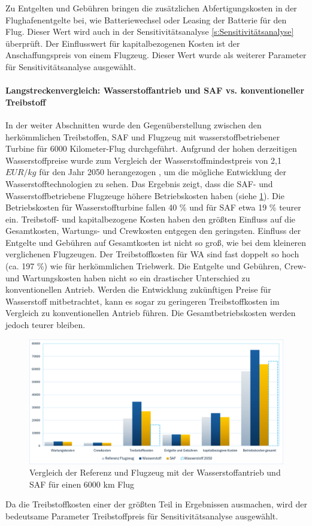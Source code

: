 Zu Entgelten und Gebühren bringen die zusätzlichen Abfertigungskosten in der Flughafenentgelte bei, wie Batteriewechsel oder Leasing der Batterie
für den Flug. Dieser Wert wird auch in der Sensitivitätsanalyse \ref{s:Sensitivitätsanalyse} überprüft. Der Einflusswert für kapitalbezogenen Kosten ist
der Anschaffungspreis von einem Flugzeug. Dieser Wert wurde als weiterer Parameter für Sensitivitätsanalyse ausgewählt.\\

\paragraph{Langstreckenvergleich: Wasserstoffantrieb und SAF vs. konventioneller Treibstoff}
In der weiter Abschnitten wurde den Gegenüberstellung zwischen den herkömmlichen Treibstoffen, SAF
und Flugzeug mit wasserstoffbetriebener Turbine für 6000 Kilometer-Flug durchgeführt. %
Aufgrund der hohen derzeitigen Wasserstoffpreise wurde zum Vergleich der Wasserstoffmindestpreis von 2,1 $EUR/kg$ für den 
Jahr 2050 herangezogen \cite{hoelzen2022hydrogen}, um die mögliche Entwicklung der Wasserstofftechnologien zu sehen.
%
Das Ergebnis zeigt, dass die SAF- und Wasserstoffbetriebene Flugzeuge höhere Betriebskosten haben (siehe \ref{vergleichWA_Ref}).
Die Betriebskosten für Wasserstoffturbine fallen 40 \% und für SAF etwa 19 \% teurer ein.
Treibstoff- und kapitalbezogene Kosten haben den größten Einfluss auf die Gesamtkosten, Wartungs- und Crewkosten entgegen den geringsten.
Einfluss der Entgelte und Gebühren auf Gesamtkosten ist nicht so groß, wie bei dem kleineren verglichenen Flugzeugen.
Der Treibstoffkosten für WA sind fast doppelt so hoch (ca. 197 \%) wie für herkömmlichen Triebwerk. Die Entgelte und Gebühren, 
Crew- und Wartungskosten haben nicht so ein drastischer Unterschied zu konventionellen Antrieb. 
%
Werden die Entwicklung zukünftigen Preise für Wasserstoff mitbetrachtet, kann es sogar zu geringeren Treibstoffkosten im Vergleich 
zu konventionellen Antrieb führen. Die Gesamtbetriebskosten werden jedoch teurer bleiben.

\begin{figure}[h]
	\centering
	\includegraphics[width=0.9\linewidth]{Bilder/VergleichWA_SAF.png}
	\caption[Betriebskosten]{Vergleich der Referenz und Flugzeug mit der Wasserstoffantrieb und SAF für einen 6000 km Flug}
	\label{vergleichWA_Ref}
\end{figure}

Da die Treibstoffkosten einer der größten Teil in Ergebnissen ausmachen, wird der bedeutsame Parameter 
Treibstoffpreis für Sensitivitätsanalyse ausgewählt.
